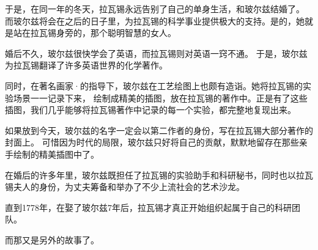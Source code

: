 \documentclass[a4paper]{article}
\begin{document}
于是，在同一年的冬天，拉瓦锡永远告别了自己的单身生活，和玻尔兹结婚了。
而玻尔兹将会在之后的日子里，为拉瓦锡的科学事业提供极大的支持。是的，她就是站在拉瓦锡身旁的，那个聪明智慧的女人。

婚后不久，玻尔兹很快学会了英语，而拉瓦锡则对英语一窍不通。
于是，玻尔兹为拉瓦锡翻译了许多英语世界的化学著作。

同时，在著名画家\os{}{-}·的指导下，玻尔兹在工艺绘图上也颇有造诣。她将拉瓦锡的实验场景一一记录下来，
绘制成精美的插图，放在拉瓦锡的著作中。正是有了这些插图，我们几乎能够将拉瓦锡著作中记录的每一个实验，都完整地复现出来。

如果放到今天，玻尔兹的名字一定会以第二作者的身份，写在拉瓦锡大部分著作的封面上。
可惜因为时代的局限，玻尔兹只好将自己的贡献，默默地留存在那些亲手绘制的精美插图中了。

在婚后的许多年里，玻尔兹既担任了拉瓦锡的实验助手和科研秘书，同时也以拉瓦锡夫人的身份，为丈夫筹备和举办了不少上流社会的艺术沙龙。

直到1778年，在娶了玻尔兹7年后，拉瓦锡才真正开始组织起属于自己的科研团队。

而那又是另外的故事了。

\end{document}
